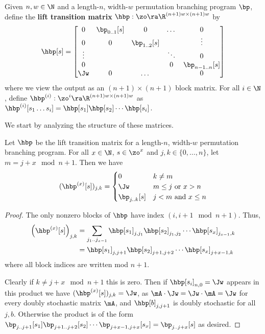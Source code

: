 \begin{definition}\label{def:hbp}
Given $n,w\in \N$ and a length-$n$, width-$w$ permutation branching program $\bp$, define the \textbf{lift transition matrix} $\hbp:\zo\ra \R^{(n+1)w\times(n+1)w}$ by
\[\hbp[s] = \begin{bmatrix}
0 & \bp_{0..1}[s] & 0 & \dots & 0\\
0 & 0 & \bp_{1..2}[s] &  & \vdots\\
\vdots & &  & \ddots & 0\\
0 & ~ &   & 0 & \bp_{n-1..n}[s]\\
\Jw & 0 & \dots & & 0\\
\end{bmatrix}\]
where we view the output as an $(n+1)\times(n+1)$ block matrix. For all $i\in\N$, define $\hbp^{(i)}:\zo^{i}\ra \R^{(n+1)w\times(n+1)w}$ as $\hbp^{(i)}[s_1\dots s_i]=\hbp[s_1]\hbp[s_2]\cdots\hbp[s_{i}]$.
\end{definition}

We start by analyzing the structure of these matrices.
\begin{proposition}\label{prop:HBPstruct}
Let $\hbp$ be the lift transition matrix for a length-$n$, width-$w$ permutation branching program. %
For  %
all $x \in \N$, $s \in \zo^x$ and $j,k\in \{0,\ldots,n\}$, let $m=j+x\mod n+1$. 
%
Then we have  %
\[(\hbp^{(x)}[s])_{j,k} = \begin{cases}
0 & k\neq m\\
\Jw & m \leq j \text{ or } x>n\\
\bp_{j..k}[s] & j < m \text{ and } x\leq n
\end{cases}\]
\end{proposition}
\begin{proof}
The only nonzero blocks of $\hbp$ have index $(i,i+1 \mod n+1)$. Thus, 
\begin{align*}
    \left(\hbp^{(x)}[s]\right)_{j,k} &= \sum_{j_1..j_{x-1}}\hbp[s_1]_{j,j_1}\hbp[s_2]_{j_1,j_2}\cdots \hbp[s_x]_{j_{x-1},k}\\
    &= \hbp[s_1]_{j,j+1}\hbp[s_2]_{j+1,j+2}\cdots \hbp[s_x]_{j+x-1,k} %
\end{align*}
%
where %
all block indices are written mod $n+1$.

Clearly if $k\neq j+x\mod n+1$ this is zero. Then if $\hbp[s_i]_{n,0}=\Jw$ appears in this product we have $(\hbp^{(x)}[s])_{j,k}=\Jw$, as $\mA\cdot\Jw=\Jw\cdot\mA=\Jw$ for every doubly stochastic matrix $\mA$, and $\hbp[b]_{j,j+1}$ is doubly stochastic for all $j,b$. Otherwise the product is of the form $\bp_{j..j+1}[s_1]\bp_{j+1..j+2}[s_2]\cdots \bp_{j+x-1,j+x}[s_x]=\bp_{j..j+x}[s]$ as desired.
\end{proof}

